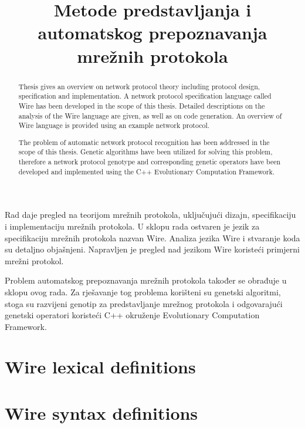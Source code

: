 \documentclass[times, utf8, diplomski]{fer}
\begin{document}
\begin{abstract}
Thesis gives an overview on network protocol theory including protocol design, 
specification and implementation. A network protocol specification language called
Wire has been developed in the scope of this thesis. Detailed descriptions on
the analysis of the Wire language are given, as well as on code generation. An
overview of Wire language is provided using an example network protocol.

The problem of automatic network protocol recognition has been addressed in the scope
of this thesis. Genetic algorithms have been utilized for solving this problem, 
therefore a network protocol genotype and corresponding genetic operators have been
developed and implemented using the C++ Evolutionary Computation Framework.

\end{abstract}

\title{Metode predstavljanja i automatskog prepoznavanja mrežnih protokola}
\begin{sazetak}
Rad daje pregled na teorijom mrežnih protokola, uključujući dizajn, specifikaciju
i implementaciju mrežnih protokola. U sklopu rada ostvaren je jezik za specifikaciju 
mrežnih protokola nazvan Wire. Analiza jezika Wire i stvaranje koda su detaljno objašnjeni.
Napravljen je pregled nad jezikom Wire koristeći primjerni mrežni protokol.

Problem automatskog prepoznavanja mrežnih protokola također se obrađuje u sklopu
ovog rada. Za rješavanje tog problema korišteni su genetski algoritmi, stoga su
razvijeni genotip za predstavljanje mrežnog protokola i odgovarajući genetski operatori
koristeći C++ okruženje Evolutionary Computation Framework.

\end{sazetak}




\appendix
\chapter{Wire lexical definitions}
\lstset{language=C}
\lstset{basicstyle=\tiny}
\lstset{numbers=left, numberstyle=\tiny, stepnumber=1, numbersep=5pt}


\chapter{Wire syntax definitions}
\lstset{language=C}
\lstset{basicstyle=\tiny}
\lstset{numbers=left, numberstyle=\tiny, stepnumber=1, numbersep=5pt}

\end{document}
